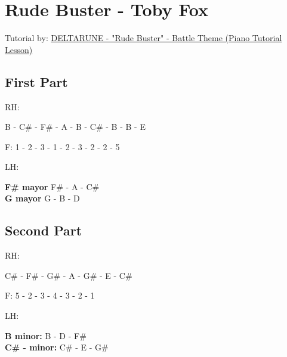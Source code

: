 
\section{Rude Buster - Toby Fox}

Tutorial by: \href{https://www.youtube.com/watch?v=0GZO1X6hiak}{ DELTARUNE - "Rude Buster" - Battle Theme (Piano Tutorial Lesson) }

\subsection{First Part}

RH: 

B - C\# - F\# - A - B - C\# - B - B - E

F: 1 - 2 - 3 - 1 - 2 - 3 - 2 - 2 - 5

LH:


\textbf{F\# mayor} F\# - A - C\#\\
\textbf{G mayor} G - B - D

\subsection{Second Part}

RH:

C\# - F\# - G\# - A - G\# - E - C\#

F: 5 - 2 - 3 - 4 - 3 - 2 - 1


LH:

\textbf{B minor:} B - D - F\#\\
\textbf{C\# - minor:} C\# - E - G\#
